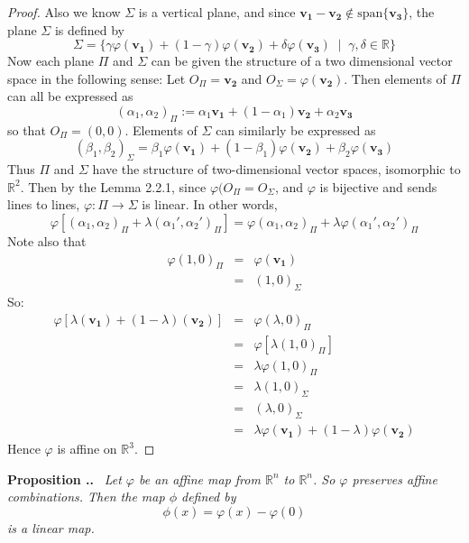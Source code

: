 \documentclass[honours]{UNSWthesis}
\newcommand{\R}{\mathbb{R}}
\newcommand{\1}{\mathbf{e}_{1}}
\newcommand{\2}{\mathbf{e}_{3}}
\newcommand{\3}{\mathbf{e}_{3}}
\newcounter{Item}[section]
\newenvironment{Proposition}{\medskip
                            \refstepcounter{Item}
                            \noindent
                           {\bf Proposition \thesection.\theItem.}\ %
                            \begingroup \sl}
                           {\endgroup\medskip}
\begin{document}
\begin{proof}
Also we know $\Sigma$ is a vertical plane, and since $\mathbf{v_{1}}-\mathbf{v_{2}} \notin \text{span}\{ \mathbf{v_{3}}\}$, the plane $\Sigma$ is defined by 
\[
\Sigma = \{ \gamma \varphi(\mathbf{v_{1}}) + (1-\gamma)\varphi(\mathbf{v_{2}}) + \delta \varphi(\mathbf{v_{3}}) \; \;|\;\; \gamma,\delta \in \R \}
\]
Now each plane $\Pi$ and $\Sigma$ can be given the structure of a two dimensional vector space in the following sense:
Let $O_{\Pi}=\mathbf{v_{2}}$ and $O_{\Sigma}= \varphi(\mathbf{v_{2}})$. Then elements of $\Pi$ can all be expressed as 
\[
(\alpha_{1}, \alpha_{2})_{\Pi}:= \alpha_{1}\mathbf{v_{1}}+(1-\alpha_{1})\mathbf{v_{2}} + \alpha_{2}\mathbf{v_{3}}
\]
so that $O_{\Pi}=(0,0)$. 
Elements of $\Sigma$ can similarly be expressed as
\[
(\beta_{1}, \beta_{2})_{\Sigma}= \beta_{1}\varphi(\mathbf{v_{1}})+(1-\beta_{1})\varphi(\mathbf{v_{2}}) + \beta_{2} \varphi (\mathbf{v_{3}})
\]
Thus $\Pi$ and $\Sigma$ have the structure of two-dimensional vector spaces, isomorphic to $\R^2$. Then by the Lemma 2.2.1, since $\varphi(O_{\Pi}=O_{\Sigma}$, and $\varphi$ is bijective and sends lines to lines, $\varphi:\Pi \longrightarrow \Sigma$ is linear. In other words, 
\[
\varphi[(\alpha_{1},\alpha_{2})_{\Pi}+\lambda(\alpha_{1}',\alpha_{2}')_{\Pi}]=\varphi(\alpha_{1},\alpha_{2})_{\Pi} + \lambda \varphi(\alpha_{1}',\alpha_{2}')_{\Pi}
\]
Note also that 
\begin{eqnarray*}
\varphi(1,0)_{\Pi}&=&\varphi(\mathbf{v_{1}}) \\
&=& (1,0)_{\Sigma}
\end{eqnarray*}
So:
\begin{eqnarray*}
\varphi[\lambda(\mathbf{v_{1}})+(1-\lambda)(\mathbf{v_{2}})] &=& \varphi(\lambda,0)_{\Pi} \\
&=& \varphi[\lambda(1,0)_{\Pi}] \\
&=& \lambda\varphi(1,0)_{\Pi} \\
&=& \lambda(1,0)_{\Sigma} \\
&=&(\lambda,0)_{\Sigma} \\
&=& \lambda\varphi(\mathbf{v_{1}})+(1-\lambda)\varphi(\mathbf{v_{2}})
\end{eqnarray*}
Hence $\varphi$ is affine on $\R^{3}$.
\end{proof}

\begin{Proposition}\label{affinelinear}
Let $\varphi$ be an affine map from $\R^{n}$ to $\R^{n}$. So $\varphi$ preserves affine combinations. Then the map $\phi$ defined by 
\[
\phi(x)=\varphi(x)-\varphi(0)
\]
is a linear map.
\end{Proposition}
\end{document}
